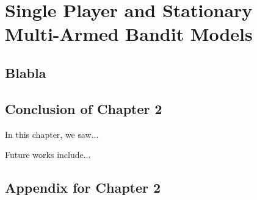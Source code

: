 
\chapter{Single Player and Stationary Multi-Armed Bandit Models}
\label{chapter:2}
\minitoc
\newpage
\graphicspath{{2-Chapters/2-Chapter/Images/}}

\section{Blabla}
\label{sec:blabla}


\section{Conclusion of Chapter 2}
\label{sec:2:conclusion}

In this chapter, we saw...

Future works include...



\section{Appendix for Chapter 2}
\label{sec:2:appendix}

